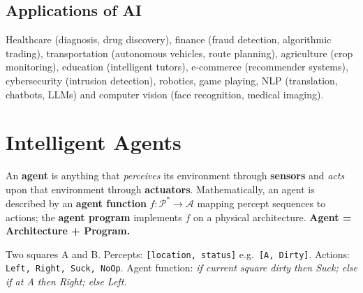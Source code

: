 \subsection{Applications of AI}
Healthcare (diagnosis, drug discovery), finance (fraud detection, algorithmic trading), transportation (autonomous vehicles, route planning), agriculture (crop monitoring), education (intelligent tutors), e-commerce (recommender systems), cybersecurity (intrusion detection), robotics, game playing, NLP (translation, chatbots, LLMs) and computer vision (face recognition, medical imaging).

\section{Intelligent Agents}
\begin{definition}[Agent]
An \textbf{agent} is anything that \emph{perceives} its environment through \textbf{sensors} and \emph{acts} upon that environment through \textbf{actuators}. Mathematically, an agent is described by an \textbf{agent function} $f:\mathcal{P}^{*}\rightarrow\mathcal{A}$ mapping percept sequences to actions; the \textbf{agent program} implements $f$ on a physical architecture. \quad \textbf{Agent = Architecture + Program.}
\end{definition}

\begin{center}
\end{center}

\begin{example}
Two squares A and B. Percepts: \texttt{[location, status]} e.g.\ \texttt{[A, Dirty]}. Actions: \texttt{Left, Right, Suck, NoOp}. Agent function: \emph{if current square dirty then Suck; else if at A then Right; else Left.}
\end{example}

